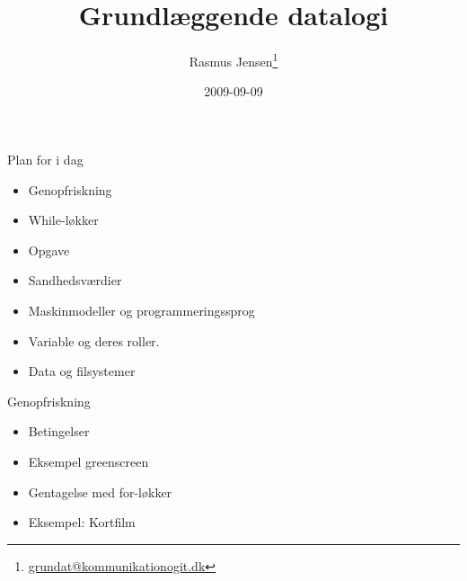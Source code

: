 \documentclass[a4paper,landscape]{slides}
\title{Grundlæggende datalogi}
\author{Rasmus Jensen\footnote{\url{grundat@kommunikationogit.dk}}}
\date{2009-09-09}
\begin{document}
\maketitle

\begin{comment}
- Genopfriskning
  - betingelser
    - greenscreen
  - gentagelse med for-løkker
    - movie

  - while-løkker
    - gentaget spørgsmål
  - brug af pythons indbyggede funktioner
    - Eksempel: random walk
      - udvid random walk med farve der ændrer sig

- sandhedsværdier, boolske udtryk og logik
  - and or not, negation af logiske udtryk
  - \verb|<| \verb|<=| == 
- øvelse

- maskinmodeller og programmeringssprog
  - maskinkode
  - fortolkere og oversættere
  - Python - dynamisk typet scriptingsprog

- variable og deres roller
  - fixed value
  - stepper
  - gatherer
    - eksempel farve-gennemsnit

- filer og filsystemer
  - binære filer og tekstfiler
  - repetition - binære tal
  - stier, seperatorer
  - ascii, latin1 og utf-8
  - indlæsning af filer i python
- torsdagskode - film og illusioner
  - Øvelse
    - gem negativt billede
    - kort film
\end{comment}

\begin{slide}
	\begin{center} {\large 
            Plan for i dag
	} \end{center}
	\begin{itemize} \addtolength{\itemsep}{-\baselineskip}
    		\item Genopfriskning
    		\item While-løkker
    		\item Opgave
    		\item Sandhedsværdier
    		\item Maskinmodeller og programmeringssprog
    		\item Variable og deres roller.
    		\item Data og filsystemer
	\end{itemize}
\end{slide}

\begin{slide}
	\begin{center} {\large 
            Genopfriskning
	} \end{center}
	\begin{itemize} \addtolength{\itemsep}{-\baselineskip}
    		\item Betingelser
    		\item Eksempel greenscreen
    		\item Gentagelse med for-løkker
    		\item Eksempel: Kortfilm
	\end{itemize}
\end{slide}
\end{document}
